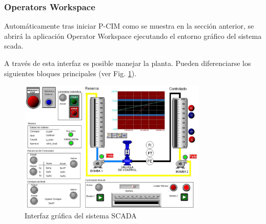 \subsubsection{Operators Workspace}

Automáticamente tras iniciar P-CIM como se muestra en la sección anterior, se 
abrirá la aplicación Operator Workspace ejecutando el entorno gráfico del 
sistema \gls{scada}.

A través de esta interfaz es posible manejar la planta.
Pueden diferenciarse los siguientes bloques principales
(ver Fig. \ref{fig:hmiscada2}).

\begin{figure}[!ht]
	\centering
	\includegraphics[width=0.8\textwidth]
	{Cap5-SCADA/images/hmiScada.jpeg}
	\caption{Interfaz gráfica del sistema SCADA}
	\label{fig:hmiscada2}
  \end{figure}
  
